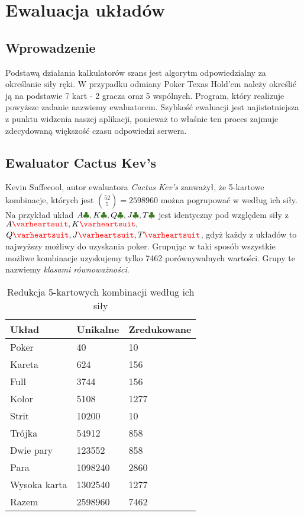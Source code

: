 \chapter{Ewaluacja układów}
\label{chapter:3}

\section{Wprowadzenie}

Podstawą działania kalkulatorów szans jest algorytm odpowiedzialny za określanie siły ręki. W przypadku odmiany Poker Texas Hold’em należy określić ją na podstawie 7 kart - 2 gracza oraz 5 wspólnych. Program, który realizuje powyższe zadanie nazwiemy ewaluatorem. Szybkość ewaluacji jest najistotniejsza z punktu widzenia naszej aplikacji, ponieważ to właśnie ten proces zajmuje zdecydowaną większość czasu odpowiedzi serwera.

\section{Ewaluator Cactus Kev's}

Kevin Suffecool, autor ewaluatora \emph{Cactus Kev's} \cite{cactus-kev-evaluator} \cite{cactus-kev-equivalence-classes} zauważył, że 5-kartowe kombinacje, których jest $\binom{52}{5}= 2598960$ można pogrupować w według ich siły. Na przykład układ $A\clubs, K\clubs, Q\clubs, J\clubs, T\clubs$ jest identyczny pod względem siły z $A\hearts, K\hearts, $ $Q\hearts, J\hearts, T\hearts$, gdyż każdy z układów to najwyższy możliwy do uzyskania poker. Grupując w taki sposób wszystkie możliwe kombinacje uzyskujemy tylko 7462 porównywalnych wartości. Grupy te nazwiemy \emph{klasami równoważności}.

\begin{table}[htbp]
    \centering
    \begin{tabular}{lll}
        Układ & Unikalne & Zredukowane \\
        \midrule
        Poker          & 40                         & 10  \\
        Kareta         & 624                        & 156   \\
        Full           & 3744                       & 156  \\
        Kolor          & 5108                       & 1277 \\
        Strit          & 10200                      & 10 \\
        Trójka         & 54912                      & 858  \\
        Dwie pary      & 123552                     & 858  \\
        Para           & 1098240                    & 2860 \\
        Wysoka karta   & 1302540                    & 1277 \\
        \bottomrule
        Razem          & 2598960                    & 7462 \\
        \bottomrule
    \end{tabular}
    \caption{\label{tab:catus-kev-reduction}Redukcja 5-kartowych kombinacji według ich siły}
\end{table}


